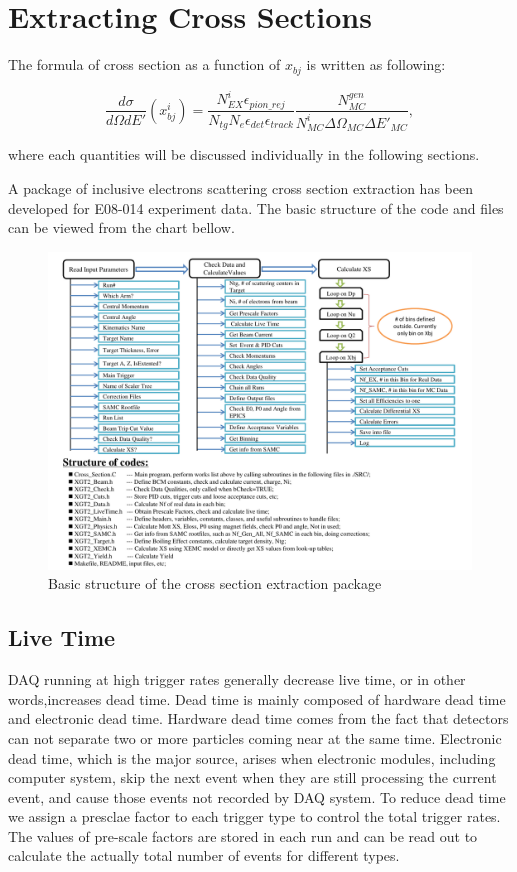 \section{Extracting Cross Sections}

The formula of cross section as a function of $x_{bj}$ is written as following:

\begin{equation}
 \frac{d\sigma}{d\Omega dE'}(x_{bj}^{i}) = \frac{N_{EX}^{i} \epsilon_{pion\_rej}}{N_{tg} N_{e} \epsilon_{det} \epsilon_{track}} \frac{N_{MC}^{gen}}{N_{MC}^{i} \Delta\Omega_{MC} \Delta E'_{MC}},
\label{xs_eq}
\end{equation}

where each quantities will be discussed individually in the following sections.

A package of inclusive electrons scattering cross section extraction has been developed for E08-014 experiment data. The basic structure of the code and files can be viewed from the chart bellow.

\begin{figure}[h!]
 \centerline{\includegraphics[width=0.95\linewidth]{./figures/XS_Chart}}
 \caption[Basic structure of XS package]{Basic structure of the cross section extraction package}
 \label{xs_chart}
\end{figure}

\subsection{Live Time}

DAQ running at high trigger rates generally decrease live time, or in other words,increases dead time. Dead time is mainly composed of hardware dead time and electronic dead time. Hardware dead time comes from the fact that detectors can not separate two or more particles coming near at the same time. Electronic dead time, which is the major source, arises when electronic modules, including computer system, skip the next event when they are still processing the current event, and cause those events not recorded by DAQ system. To reduce dead time we assign a presclae factor to each trigger type to control the total trigger rates. The values of pre-scale factors are stored in each run and can be read out to calculate the actually total number of events for different types. 

